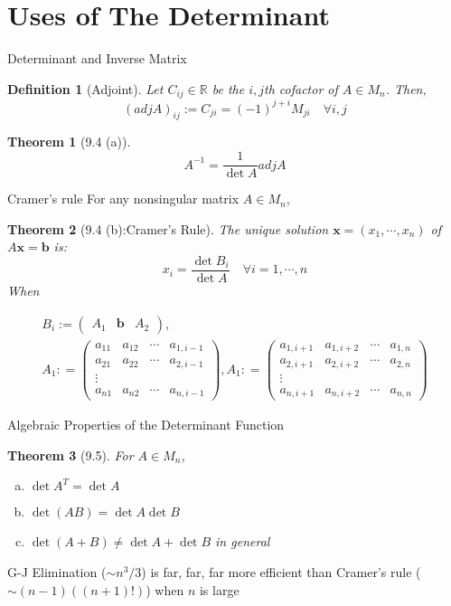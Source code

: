 \documentclass[a4paper,11pt]{article}
\newtheorem{defn}{Definition}
\newtheorem{thm}{Theorem}
\begin{document}
\section{Uses of The Determinant} %
\label{sec:uses_of_the_determinant}
\begin{frame}[t]{Determinant and Inverse Matrix}
	\begin{defn}
		[Adjoint] Let $C_{ij}\in\mathbb{R}$ be the $i,j$th cofactor of $A\in M_n$. Then, \[
			(adj A)_{ij}:=C_{ji} = (-1)^{j+i}M_{ji} \quad\forall i,j
		\]
	\end{defn}
	\begin{thm}
		[9.4 (a)]\[
			A^{-1} = \frac{1}{\det A}adj A
		\]
	\end{thm}
\end{frame}
\begin{frame}[t]{Cramer's rule}
	For any nonsingular matrix $A\in M_n$,
	\begin{thm}
		[9.4 (b):Cramer's Rule]
			The unique solution $\mathbf{x}=(x_1,\cdots,x_n)$ of $A\mathbf{x}=\mathbf{b}$ is:
			\[
				x_i = \frac{\det B_i}{\det A} \quad\forall i=1,\cdots,n
			\] When 
			\begin{tiny}
				\begin{multline*}
					B_i := \begin{pmatrix}
						A_1 & \mathbf{b} & A_2
					\end{pmatrix},\\ A_1 : = \begin{pmatrix}
						a_{11}&a_{12}&\cdots&a_{1,i-1}\\
						a_{21}&a_{22}&\cdots&a_{2,i-1}\\
						\vdots\\
						a_{n1}&a_{n2}&\cdots&a_{n,i-1}
					\end{pmatrix}, A_1 : = \begin{pmatrix}
						a_{1,i+1}&a_{1,i+2}&\cdots&a_{1,n}\\
						a_{2,i+1}&a_{2,i+2}&\cdots&a_{2,n}\\
						\vdots\\
						a_{n,i+1}&a_{n,i+2}&\cdots&a_{n,n}
					\end{pmatrix}
				\end{multline*}
			\end{tiny}
	\end{thm}
\end{frame}
\begin{frame}[t]{Algebraic Properties of the Determinant Function}
	\begin{thm}
		[9.5] For $A\in M_n$, 
		\begin{enumerate}[(a)]
			\item $\det A^T = \det A$
			\item $\det(AB)=\det A \det B$
			\item $\det(A+B)\neq \det A + \det B$ in general
		\end{enumerate}
	\end{thm}
	G-J Elimination ($\sim n^3/3$) is far, far, far more efficient than Cramer's rule ($\sim (n-1)((n+1)!)$) when $n$ is large
\end{frame}
\end{document}
